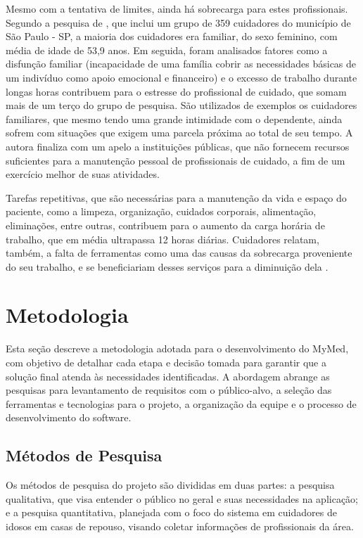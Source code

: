 \documentclass[
	article,			%
	12pt,				%
	oneside,			%
	a4paper,			%
    BIBLATEX,           %
	english,			%
	brazil,				%
	sumario=tradicional
	]{abntex2}
\newcommand\nomeprojeto{MyMed}
\begin{document}
Mesmo com a tentativa de limites, ainda há sobrecarga para estes profissionais. Segundo a pesquisa de , que inclui um grupo de 359 cuidadores do município de São Paulo - SP, a maioria dos cuidadores era familiar, do sexo feminino, com média de idade de 53,9 anos. Em seguida, foram analisados fatores como a disfunção familiar (incapacidade de uma família cobrir as necessidades básicas de um indivíduo como apoio emocional e financeiro) e o excesso de trabalho durante longas horas contribuem para o estresse do profissional de cuidado, que somam mais de um terço do grupo de pesquisa. São utilizados de exemplos os cuidadores familiares, que mesmo tendo uma grande intimidade com o dependente, ainda sofrem com situações que exigem uma parcela próxima ao total de seu tempo. A autora finaliza com um apelo a instituições públicas, que não fornecem recursos suficientes para a manutenção pessoal de profissionais de cuidado, a fim de um exercício melhor de suas atividades.

Tarefas repetitivas, que são necessárias para a manutenção da vida e espaço do paciente, como a limpeza, organização, cuidados corporais, alimentação, eliminações, entre outras, contribuem para o aumento da carga horária de trabalho, que em média ultrapassa 12 horas diárias. Cuidadores relatam, também, a falta de ferramentas como uma das causas da sobrecarga proveniente do seu trabalho, e se beneficiariam desses serviços para a diminuição dela \cite{aline2012sobrecarga}.

\section{Metodologia}

Esta seção descreve a metodologia adotada para o desenvolvimento do \nomeprojeto, com objetivo de detalhar cada etapa e decisão tomada para garantir que a solução final atenda às necessidades identificadas. A abordagem abrange as pesquisas para levantamento de requisitos com o público-alvo, a seleção das ferramentas e tecnologias para o projeto, a organização da equipe e o processo de desenvolvimento do software.

\subsection{Métodos de Pesquisa}

Os métodos de pesquisa do projeto são divididas em duas partes: a pesquisa qualitativa, que visa entender o público no geral e suas necessidades na aplicação; e a pesquisa quantitativa, planejada com o foco do sistema em cuidadores de idosos em casas de repouso, visando coletar informações de profissionais da área. 
\end{document}

